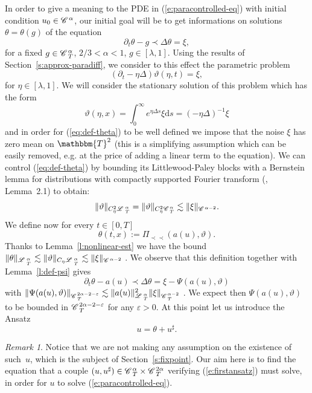 \documentclass{amsart}
\newcommand{\assign}{:=}
\newcommand{\mathd}{\mathrm{d}}
\newcommand{\precprec}{\prec\!\!\!\prec}
\theoremstyle{remark}
\newtheorem{remark}[theorem]{Remark}
\theoremstyle{definition}
\newcommand{\CC}{\mathscr{C} \hspace{.1em}}
\newcommand{\LL}{\mathscr{L} \hspace{.2em}}
\begin{document}
In order to give a meaning to the PDE in (\ref{e:paracontrolled-eq}) with
initial condition $u_0 \in \CC^{\alpha}$, our initial goal will be to get
informations on solutions $\theta = \theta (g)$ of the equation
\[ \partial_t \theta - g \prec \Delta \theta = \xi, \]
for a fixed $g \in \CC^{\alpha}_T$, $2 / 3 < \alpha < 1$, $g \in [\lambda,
1]$. Using the results of Section~\ref{s:approx-paradiff}, we consider to this
effect the parametric problem
\[ (\partial_t - \eta \Delta) \vartheta (\eta, t) = \xi, \]
for $\eta \in [\lambda, 1]$. We will consider the stationary solution of this
problem which has the form
\begin{equation}
  \vartheta (\eta, x) = \int_0^{\infty} e^{\eta \Delta s} \xi \mathd s = (-
  \eta \Delta)^{- 1} \xi \label{eq:def-theta}
\end{equation}
and in order for (\ref{eq:def-theta}) to be well defined we impose that the
noise $\xi$ has zero mean on $\mathbbm{T}^2$ (this is a simplifying assumption
which can be easily removed, e.g. at the price of adding a linear term to the
equation). We can control (\ref{eq:def-theta}) by bounding its
Littlewood-Paley blocks with a Bernstein lemma for distributions with
compactly supported Fourier transform ({\cite{bahouri_fourier_2011}},
Lemma~2.1) to obtain:
\begin{equation}
  \| \vartheta \|_{C_{\eta}^2 \LL^{\alpha}_T} = \| \vartheta \|_{C_{\eta}^2
  \CC^{\alpha}_T} \lesssim \| \xi \|_{\CC^{\alpha - 2}} .
  \label{eq:vartheta-est} 
\end{equation}
We define now for every $t \in [0, T]$
\[ \theta (t, x) \assign \Pi_{\precprec} (a (u), \vartheta) . \]
Thanks to Lemma~\ref{l:nonlinear-est} we have the bound $\| \theta
\|_{\LL^{\alpha}_{_T}} \lesssim \| \vartheta \|_{C_{\eta} \LL^{\alpha}_{_T}}
\lesssim \| \xi \|_{\CC^{\alpha - 2}}$ . We observe that this definition
together with Lemma~\ref{l:def-psi} gives
\[ \partial_t \theta - a (u) \prec \Delta \theta = \xi - \Psi (a (u),
   \vartheta) \]
with $\| \Psi (a (u), \vartheta) \|_{\CC^{2 \alpha - 2 - \varepsilon}_T}
\lesssim \| a (u) \|^2_{\LL^{\alpha}_T} \| \xi \|_{\CC^{\alpha - 2}_T}$ . We
expect then $\Psi (a (u), \vartheta)$ to be bounded in $\CC^{2 \alpha - 2 -
\varepsilon}_T$ for any $\varepsilon > 0$. At this point let us introduce the
Ansatz
\begin{equation}
  u = \theta + u^{\sharp} . \label{e:firstansatz}
\end{equation}
\begin{remark}
  Notice that we are not making any assumption on the existence of such~$u$,
  which is the subject of Section~\ref{s:fixpoint}. Our aim here is to find
  the equation that a couple $(u, u^{\sharp}) \in \CC_T^{\alpha} \times
  \CC_T^{2 \alpha}$ verifying (\ref{e:firstansatz}) must solve, in order for
  $u$ to solve (\ref{e:paracontrolled-eq}).
\end{remark}
\end{document}
